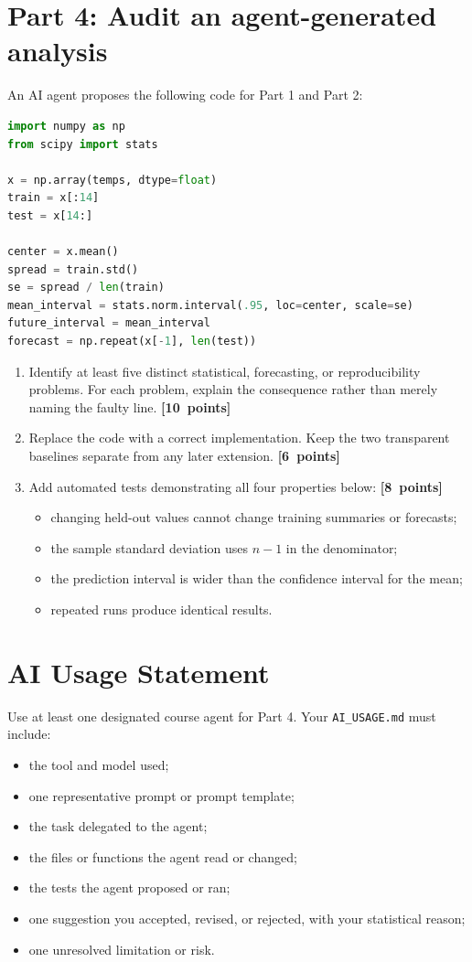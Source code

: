 \documentclass[11pt]{article}
\newcommand{\points}[1]{\nobreak\hfill\mbox{\textcolor{GTBlue}{\textbf{[#1 points]}}}}
\begin{document}
\section*{Part 4: Audit an agent-generated analysis}

An AI agent proposes the following code for Part 1 and Part 2:

\begin{lstlisting}[language=Python]
import numpy as np
from scipy import stats

x = np.array(temps, dtype=float)
train = x[:14]
test = x[14:]

center = x.mean()
spread = train.std()
se = spread / len(train)
mean_interval = stats.norm.interval(.95, loc=center, scale=se)
future_interval = mean_interval
forecast = np.repeat(x[-1], len(test))
\end{lstlisting}

\begin{enumerate}[label=\textbf{4\alph*.}]
  \item Identify at least five distinct statistical, forecasting, or reproducibility problems. For each problem, explain the consequence rather than merely naming the faulty line. \points{10}
  \item Replace the code with a correct implementation. Keep the two transparent baselines separate from any later extension. \points{6}
  \item Add automated tests demonstrating all four properties below: \points{8}
    \begin{itemize}
      \item changing held-out values cannot change training summaries or forecasts;
      \item the sample standard deviation uses $n-1$ in the denominator;
      \item the prediction interval is wider than the confidence interval for the mean;
      \item repeated runs produce identical results.
    \end{itemize}
\end{enumerate}

\section*{AI Usage Statement}

Use at least one designated course agent for Part 4. Your \texttt{AI\_USAGE.md} must include:
\begin{itemize}
  \item the tool and model used;
  \item one representative prompt or prompt template;
  \item the task delegated to the agent;
  \item the files or functions the agent read or changed;
  \item the tests the agent proposed or ran;
  \item one suggestion you accepted, revised, or rejected, with your statistical reason;
  \item one unresolved limitation or risk.
\end{itemize}
\end{document}
